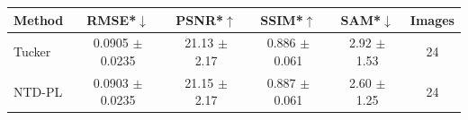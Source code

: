 \begin{tabular}{@{}l c c c c c@{}}
\toprule
Method & RMSE*$\downarrow$ & PSNR*$\uparrow$ & SSIM*$\uparrow$ & SAM*$\downarrow$ & Images\\
\midrule
Tucker & 0.0905 $\pm$ 0.0235 & 21.13 $\pm$ 2.17 & 0.886 $\pm$ 0.061 & 2.92 $\pm$ 1.53 & 24\\
NTD-PL & 0.0903 $\pm$ 0.0235 & 21.15 $\pm$ 2.17 & 0.887 $\pm$ 0.061 & 2.60 $\pm$ 1.25 & 24\\
\bottomrule
\end{tabular}
